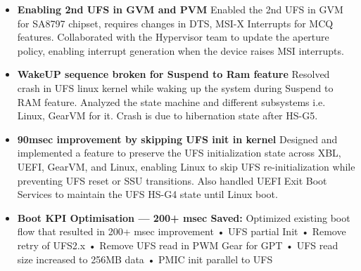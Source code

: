 \documentclass[10pt, a4paper]{article}
\begin{document}
\begin{itemize}
  \item \textbf{Enabling 2nd UFS in GVM and PVM}
      Enabled the 2nd UFS in GVM for SA8797 chipset, requires changes in DTS, MSI-X Interrupts for MCQ features.
      Collaborated with the Hypervisor team to update the aperture policy, enabling interrupt generation when the device raises MSI interrupts.

  \item \textbf{WakeUP sequence broken for Suspend to Ram feature}
		Resolved crash in UFS linux kernel while waking up the system during Suspend to RAM
		feature. Analyzed the state machine and different subsystems i.e. Linux, GearVM for it.
      Crash is due to hibernation state after HS-G5.

  \item \textbf{90msec improvement by skipping UFS init in kernel}
      Designed and implemented a feature to preserve the UFS initialization state across XBL,
      UEFI, GearVM, and Linux, enabling Linux to skip UFS re-initialization while preventing
      UFS reset or SSU transitions. Also handled UEFI Exit Boot Services to maintain the UFS HS-G4 state until Linux boot.

  \item \textbf{Boot KPI Optimisation --- 200+ msec Saved:}
		Optimized existing boot flow that resulted in 200+ msec improvement
		• UFS partial Init • Remove retry of UFS2.x
		• Remove UFS read in PWM Gear for GPT • UFS read size increased to 256MB data
		• PMIC init parallel to UFS


\end{itemize}
\end{document}
